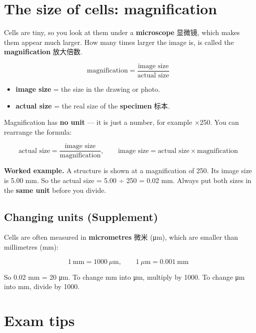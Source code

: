 \documentclass[11pt]{article}
\begin{document}
\section*{The size of cells: magnification}

Cells are tiny, so you look at them under a \textbf{microscope} 显微镜, which makes them appear much larger. How many times larger the image is, is called the \textbf{magnification} 放大倍数.

\[
\text{magnification} = \frac{\text{image size}}{\text{actual size}}
\]

\begin{itemize}
\item \textbf{image size} = the size in the drawing or photo.

\item \textbf{actual size} = the real size of the \textbf{specimen} 标本.

\end{itemize}

Magnification has \textbf{no unit} — it is just a number, for example ×250. You can rearrange the formula:

\[
\text{actual size} = \frac{\text{image size}}{\text{magnification}}, \qquad \text{image size} = \text{actual size} \times \text{magnification}
\]

\textbf{Worked example.} A structure is shown at a magnification of 250. Its image size is 5.00 mm. So the actual size = 5.00 ÷ 250 = 0.02 mm. Always put both sizes in the \textbf{same unit} before you divide.

\subsection*{Changing units (Supplement)}

Cells are often measured in \textbf{micrometres} 微米 (μm), which are smaller than millimetres (mm):

\[
1\ \text{mm} = 1000\ \mu\text{m}, \qquad 1\ \mu\text{m} = 0.001\ \text{mm}
\]

So 0.02 mm = 20 μm. To change mm into μm, multiply by 1000. To change μm into mm, divide by 1000.

\section*{Exam tips}
\end{document}
